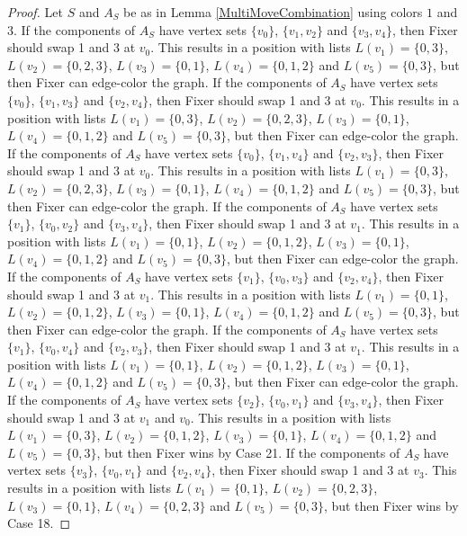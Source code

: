 \documentclass[12pt]{amsart}
\theoremstyle{plain}
\theoremstyle{definition}
\theoremstyle{remark}
\begin{document}
\begin{proof}
Let $S$ and $A_S$ be as in Lemma \ref{MultiMoveCombination} using colors $1$ and $3$. If the components of $A_S$ have vertex sets $\{v_0\}$, $\{v_1, v_2\}$ and $\{v_3, v_4\}$, then Fixer should swap 1 and 3 at $v_0$. This results in a position with lists $L(v_1) = \{0, 3\}$, $L(v_2) = \{0, 2, 3\}$, $L(v_3) = \{0, 1\}$, $L(v_4) = \{0, 1, 2\}$ and $L(v_5) = \{0, 3\}$, but then Fixer can edge-color the graph.
If the components of $A_S$ have vertex sets $\{v_0\}$, $\{v_1, v_3\}$ and $\{v_2, v_4\}$, then Fixer should swap 1 and 3 at $v_0$. This results in a position with lists $L(v_1) = \{0, 3\}$, $L(v_2) = \{0, 2, 3\}$, $L(v_3) = \{0, 1\}$, $L(v_4) = \{0, 1, 2\}$ and $L(v_5) = \{0, 3\}$, but then Fixer can edge-color the graph.
If the components of $A_S$ have vertex sets $\{v_0\}$, $\{v_1, v_4\}$ and $\{v_2, v_3\}$, then Fixer should swap 1 and 3 at $v_0$. This results in a position with lists $L(v_1) = \{0, 3\}$, $L(v_2) = \{0, 2, 3\}$, $L(v_3) = \{0, 1\}$, $L(v_4) = \{0, 1, 2\}$ and $L(v_5) = \{0, 3\}$, but then Fixer can edge-color the graph.
If the components of $A_S$ have vertex sets $\{v_1\}$, $\{v_0, v_2\}$ and $\{v_3, v_4\}$, then Fixer should swap 1 and 3 at $v_1$. This results in a position with lists $L(v_1) = \{0, 1\}$, $L(v_2) = \{0, 1, 2\}$, $L(v_3) = \{0, 1\}$, $L(v_4) = \{0, 1, 2\}$ and $L(v_5) = \{0, 3\}$, but then Fixer can edge-color the graph.
If the components of $A_S$ have vertex sets $\{v_1\}$, $\{v_0, v_3\}$ and $\{v_2, v_4\}$, then Fixer should swap 1 and 3 at $v_1$. This results in a position with lists $L(v_1) = \{0, 1\}$, $L(v_2) = \{0, 1, 2\}$, $L(v_3) = \{0, 1\}$, $L(v_4) = \{0, 1, 2\}$ and $L(v_5) = \{0, 3\}$, but then Fixer can edge-color the graph.
If the components of $A_S$ have vertex sets $\{v_1\}$, $\{v_0, v_4\}$ and $\{v_2, v_3\}$, then Fixer should swap 1 and 3 at $v_1$. This results in a position with lists $L(v_1) = \{0, 1\}$, $L(v_2) = \{0, 1, 2\}$, $L(v_3) = \{0, 1\}$, $L(v_4) = \{0, 1, 2\}$ and $L(v_5) = \{0, 3\}$, but then Fixer can edge-color the graph.
If the components of $A_S$ have vertex sets $\{v_2\}$, $\{v_0, v_1\}$ and $\{v_3, v_4\}$, then Fixer should swap 1 and 3 at $v_1$ and $v_0$. This results in a position with lists $L(v_1) = \{0, 3\}$, $L(v_2) = \{0, 1, 2\}$, $L(v_3) = \{0, 1\}$, $L(v_4) = \{0, 1, 2\}$ and $L(v_5) = \{0, 3\}$, but then Fixer wins by Case 21.
If the components of $A_S$ have vertex sets $\{v_3\}$, $\{v_0, v_1\}$ and $\{v_2, v_4\}$, then Fixer should swap 1 and 3 at $v_3$. This results in a position with lists $L(v_1) = \{0, 1\}$, $L(v_2) = \{0, 2, 3\}$, $L(v_3) = \{0, 1\}$, $L(v_4) = \{0, 2, 3\}$ and $L(v_5) = \{0, 3\}$, but then Fixer wins by Case 18.

\end{proof}
\end{document}
